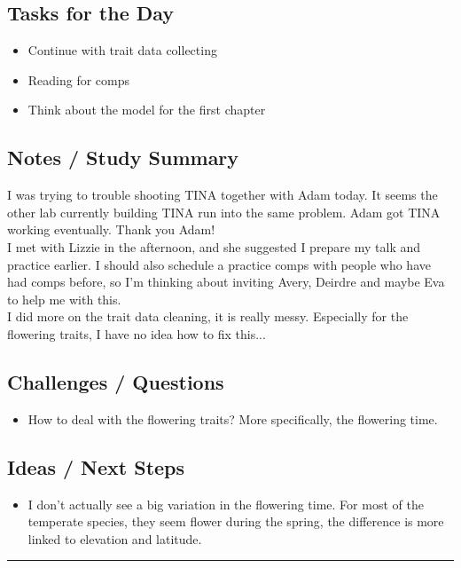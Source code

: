 \documentclass[12pt]{article}
\begin{document}
\subsection*{Tasks for the Day}
\begin{itemize}
    \item Continue with trait data collecting
    \item Reading for comps
    \item Think about the model for the first chapter
\end{itemize}
\subsection*{Notes / Study Summary}
I was trying to trouble shooting TINA together with Adam today. It seems the other lab currently building TINA run into the same problem. Adam got TINA working eventually. Thank you Adam!\\
I met with Lizzie in the afternoon, and she suggested I prepare my talk and practice earlier. I should also schedule a practice comps with people who have had comps before, so I'm thinking about inviting Avery, Deirdre and maybe Eva to help me with this.\\
I did more on the trait data cleaning, it is really messy. Especially for the flowering traits, I have no idea how to fix this...
\subsection*{Challenges / Questions}
\begin{itemize}
    \item How to deal with the flowering traits? More specifically, the flowering time.
\end{itemize}

\subsection*{Ideas / Next Steps}
\begin{itemize}
    \item I don't actually see a big variation in the flowering time. For most of the temperate species, they seem flower during the spring, the difference is more linked to elevation and latitude.
\end{itemize}

\vspace{1em}
\hrule
\vspace{1em}
\end{document}
